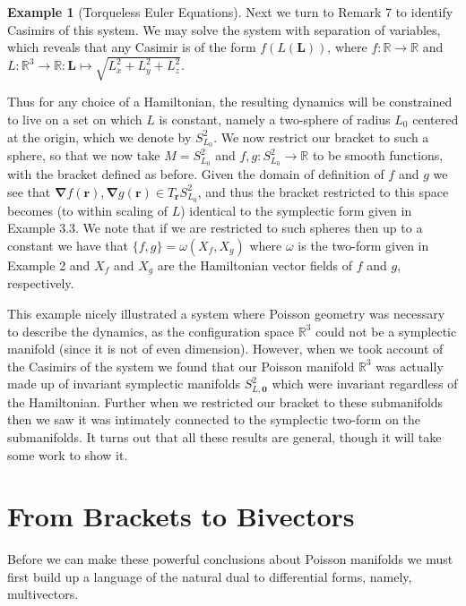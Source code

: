 \documentclass[psamsfonts,12pt]{amsart}
\newcommand\tr{\mathbf{r}}
\newcommand\0{\mathbf{0}}
\newcommand\grad{\boldsymbol{\nabla}}
\theoremstyle{plain}
\theoremstyle{definition}
\newtheorem{ex}[thm]{Example} %
\newcommand{\bL}{\mathbf{L}}
\newcommand{\bbR}{\mathbb{R}}
\begin{document}
\begin{ex}[Torqueless Euler Equations]
Next we turn to Remark 7 to identify Casimirs of this system.  We may solve the system with separation of variables, which reveals that any Casimir is of the form $f(L(\bL))$, where $f\colon \bbR\rightarrow \bbR$ and $L\colon \bbR^3\rightarrow \bbR \colon \bL\mapsto \sqrt{L_x^2+L_y^2+L_z^2}$.

Thus for any choice of a Hamiltonian, the resulting dynamics will be constrained to live on a set on which $L$ is constant, namely a two-sphere of radius $L_0$ centered at the origin, which we denote by $S^2_{L_0}$.  We now restrict our bracket to such a sphere, so that we now take $M=S^2_{L_0}$ and $f,g\colon S^2_{L_0}\rightarrow \bbR$ to be smooth functions, with the bracket defined as before.  Given the domain of definition of $f$ and $g$ we see that $\grad f(\tr),\grad g(\tr) \in T_\tr S^2_{L_0}$, and thus the bracket restricted to this space becomes (to within scaling of $L$) identical to the symplectic form given in Example 3.3.  We note that if we are restricted to such spheres then up to a constant we have that $\{f,g\}=\omega(X_f,X_g)$ where $\omega$ is the two-form given in Example 2 and $X_f$ and $X_g$ are the Hamiltonian vector fields of $f$ and $g$, respectively.

\end{ex}

This example nicely illustrated a system where Poisson geometry was necessary to describe the dynamics, as the configuration space $\bbR^3$ could not be a symplectic manifold (since it is not of even dimension).  However, when we took account of the Casimirs of the system we found that our Poisson manifold $\bbR^3$ was actually made up of invariant symplectic manifolds $S^2_{L,\0}$ which were invariant regardless of the Hamiltonian.  Further when we restricted our bracket to these submanifolds then we saw it was intimately connected to the symplectic two-form on the submanifolds.  It turns out that all these results are general, though it will take some work to show it.






\section{From Brackets to Bivectors}

Before we can make these powerful conclusions about Poisson manifolds we must first build up a language of the natural dual to differential forms, namely, multivectors.
\end{document}
